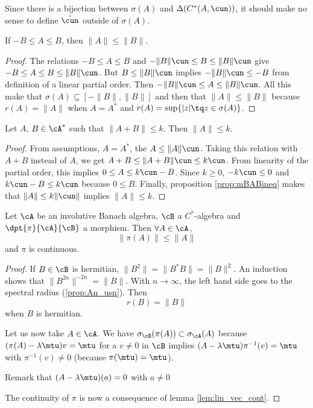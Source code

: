 Since there is a bijection between $\sigma(A)$ and $\Delta(C^*(A,\cun))$, it should make no sense to define $\hat\cun$ outside of $\sigma(A)$.

\begin{proposition} \label{prop:mBABineq}
If $-B\leq A\leq B$, then $\| A \|\leq\| B \|$.
\end{proposition}

\begin{proof}
The relations $-B\leq A\leq B$ and $-\| B \|\cun\leq B\leq\| B \|\cun$ give $-B\leq A\leq B\leq\| B \|\cun$. But $B\leq\| B \|\cun$ implies $-\| B \|\cun\leq-B$ from definition of a linear partial order. Then $-\| B \|\cun\leq A\leq\| B \|\cun$. All this make that $\sigma(A)\subseteq[-\| B \|,\| B \|]$ and then that $\| A \|\leq\| B \|$ because $r(A)=\| A \|$ when $A=A^*$ and $r(A)=\sup\{ | z |\tq z\in\sigma(A) \}$.
\end{proof}

\begin{proposition}
Let $A$, $B\in\cA^*$ such that $\| A+B \|\leq k$. Then $\| A \|\leq k$.
\end{proposition}

\begin{proof}
From assumptions, $A=A^*$, the $A\leq\| A \|\cun$. Taking this relation with $A+B$ instead of $A$, we get $A+B\leq\| A+B \|\cun\leq k\cun$. From linearity of the partial order, this implies $0\leq A\leq k\cun -B$. Since $k\geq 0$, $-k\cun\leq 0$ and $k\cun-B\leq k\cun$ because $0\leq B$. Finally, proposition \ref{prop:mBABineq}  makes that $\| A \|\leq k\| \cun \|$ implies $\| A \|\leq k$.
\end{proof}

\begin{proposition} \label{PropMDfqcUs}
Let $\cA$ be an involutive Banach algebra, $\cB$ a $C^{*}$-algebra and $\dpt{\pi}{\cA}{\cB}$ a morphism. Then $\forall A\in\cA$,
\begin{equation}  \label{eq_morleqpi}
  \|\pi(A)\|\leq\|A\|
\end{equation}
and \( \pi\) is continuous.
\end{proposition}

\begin{proof}
If $B\in\cB$ is hermitian, $\|B^2\|=\|B^*B\|=\|B\|^2$. An induction shows that $\|B^{2n}\|^{-2n}=\|B\|$. With $n\to\infty$, the left hand side goes to the spectral radius (\ref{prop:An_usn}). Then 
\begin{equation}
r(B)=\|B\|
\end{equation}
when $B$ is hermitian.

Let us now take $A\in\cA$. We have $\sigma_{\cB}(\pi(A))\subset \sigma_{\cA}(A)$ because $(\pi(A)-\lambda\mtu)v=\mtu$ for a $v\neq 0$ in $\cB$ implies $(A-\lambda\mtu)\pi^{-1}(v)=\mtu$ with $\pi^{-1}(v)\neq 0$ (because $\pi(\mtu)=\mtu$).

Remark that $(A-\lambda\mtu)(a)=0$ with $a\neq 0$

The continuity of \( \pi\) is now a consequence of lemma \ref{lem:lin_vec_cont}.
\end{proof}

